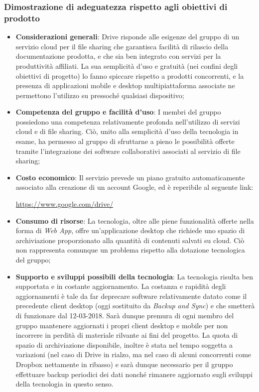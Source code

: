 \documentclass[./../Technology Baseline.tex]{subfiles}
\begin{document}
\subsubsection{Dimostrazione di adeguatezza rispetto agli obiettivi di prodotto}
\begin{itemize}
	\item \textbf{Considerazioni generali}: Drive risponde alle esigenze del gruppo di un servizio cloud per il file sharing che garantisca facilità di rilascio della documentazione prodotta, e che sia ben integrato con servizi per la produttività affiliati. La sua semplicità d'uso e gratuità (nei confini degli obiettivi di progetto) lo fanno spiccare rispetto a prodotti concorrenti, e la presenza di applicazioni mobile e desktop multipiattaforma associate ne permettono l'utilizzo su pressoché qualsiasi dispositivo;
	\item \textbf{Competenza del gruppo e facilità d'uso}: I membri del gruppo possiedono una competenza relativamente profonda nell'utilizzo di servizi cloud e di file sharing. Ciò, unito alla semplicità d'uso della tecnologia in esame, ha permesso al gruppo di sfruttarne a pieno le possibilità offerte tramite l'integrazione dei software collaborativi associati al servizio di file sharing;
	\item \textbf{Costo economico}: Il servizio prevede un piano gratuito automaticamente associato alla creazione di un account Google, ed è reperibile al seguente link:
	\begin{center}
		\url{https://www.google.com/drive/}
	\end{center}
	\item \textbf{Consumo di risorse}: La tecnologia, oltre alle piene funzionalità offerte nella forma di \textit{Web App}, offre un'applicazione desktop che richiede uno spazio di archiviazione proporzionato alla quantità di contenuti salvati su cloud. Ciò non rappresenta comunque un problema rispetto alla dotazione tecnologica del gruppo;
	\item \textbf{Supporto e sviluppi possibili della tecnologia}: La tecnologia risulta ben supportata e in costante aggiornamento. La costanza e rapidità degli aggiornamenti è tale da far deprecare software relativamente datato come il precedente client desktop (oggi sostituito da \textit{Backup and Sync}) e che smetterà di funzionare dal 12-03-2018. Sarà dunque premura di ogni membro del gruppo mantenere aggiornati i propri client desktop e mobile per non incorrere in perdità di materiale rilvante ai fini del progetto. La quota di spazio di archiviazione disponibile, inoltre è stata nel tempo soggetta a variazioni (nel caso di Drive in rialzo, ma nel caso di alcuni concorrenti come Dropbox nettamente in ribasso) e sarà dunque necessario per il gruppo effettuare backup periodici dei dati nonché rimanere aggiornato sugli sviluppi della tecnologia in questo senso.
\end{itemize}
\end{document}
